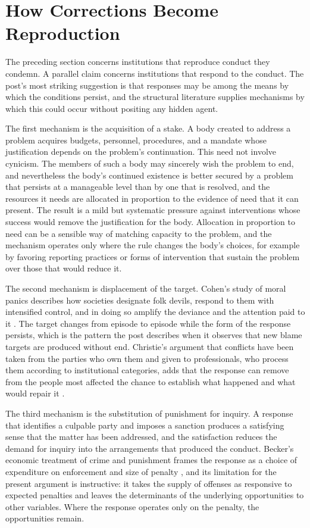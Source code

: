 \documentclass[11pt]{article}
\theoremstyle{definition}
\begin{document}
\section{How Corrections Become Reproduction}

The preceding section concerns institutions that reproduce conduct they condemn. A parallel claim concerns institutions that respond to the conduct. The post's most striking suggestion is that responses may be among the means by which the conditions persist, and the structural literature supplies mechanisms by which this could occur without positing any hidden agent.

The first mechanism is the acquisition of a stake. A body created to address a problem acquires budgets, personnel, procedures, and a mandate whose justification depends on the problem's continuation. This need not involve cynicism. The members of such a body may sincerely wish the problem to end, and nevertheless the body's continued existence is better secured by a problem that persists at a manageable level than by one that is resolved, and the resources it needs are allocated in proportion to the evidence of need that it can present. The result is a mild but systematic pressure against interventions whose success would remove the justification for the body. Allocation in proportion to need can be a sensible way of matching capacity to the problem, and the mechanism operates only where the rule changes the body's choices, for example by favoring reporting practices or forms of intervention that sustain the problem over those that would reduce it.

The second mechanism is displacement of the target. Cohen's study of moral panics describes how societies designate folk devils, respond to them with intensified control, and in doing so amplify the deviance and the attention paid to it \cite{cohen1972}. The target changes from episode to episode while the form of the response persists, which is the pattern the post describes when it observes that new blame targets are produced without end. Christie's argument that conflicts have been taken from the parties who own them and given to professionals, who process them according to institutional categories, adds that the response can remove from the people most affected the chance to establish what happened and what would repair it \cite{christie1977}.

The third mechanism is the substitution of punishment for inquiry. A response that identifies a culpable party and imposes a sanction produces a satisfying sense that the matter has been addressed, and the satisfaction reduces the demand for inquiry into the arrangements that produced the conduct. Becker's economic treatment of crime and punishment frames the response as a choice of expenditure on enforcement and size of penalty \cite{becker1968}, and its limitation for the present argument is instructive: it takes the supply of offenses as responsive to expected penalties and leaves the determinants of the underlying opportunities to other variables. Where the response operates only on the penalty, the opportunities remain.
\end{document}
